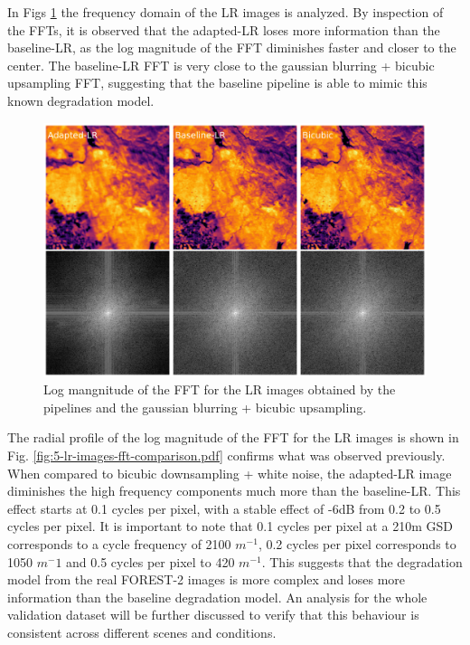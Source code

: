         In Figs \ref{fig:5-lr-images-fft.pdf} the frequency domain of the LR images is analyzed.
        By inspection of the FFTs, it is observed that the adapted-LR loses more information than the baseline-LR, as the log magnitude of the FFT diminishes faster and closer to the center.
        The baseline-LR FFT is very close to the gaussian blurring + bicubic upsampling FFT, suggesting that the baseline pipeline is able to mimic this known degradation model.

        \begin{figure}[H]
            \centering
            \includegraphics[scale=0.3]{Includes/5-lr-images-fft.pdf}
            \caption{Log mangnitude of the FFT for the LR images obtained by the pipelines and the gaussian blurring + bicubic upsampling.}
            \label{fig:5-lr-images-fft.pdf}
        \end{figure}

        The radial profile of the log magnitude of the FFT for the LR images is shown in Fig. \ref{fig:5-lr-images-fft-comparison.pdf} confirms what was observed previously. When compared to bicubic downsampling + white noise,
        the adapted-LR image diminishes the high frequency components much more than the baseline-LR. This effect starts at 0.1 cycles per pixel, with a stable effect of -6dB from 0.2 to 0.5 cycles per pixel. 
        It is important to note that 0.1 cycles per pixel at a 210m GSD corresponds to a cycle frequency of 2100 $m^{-1}$, 0.2 cycles per pixel corresponds to 1050 $m^-1$ and 0.5 cycles per pixel to 420 $m^{-1}$.
        This suggests that the degradation model from the real FOREST-2 images is more complex and loses more information than the baseline degradation model.
        An analysis for the whole validation dataset will be further discussed to verify that this behaviour is consistent across different scenes and conditions.


